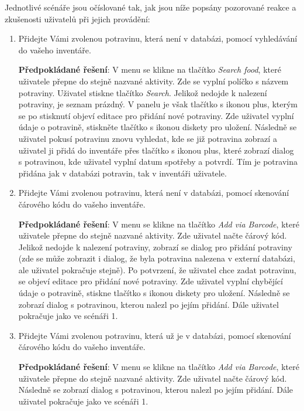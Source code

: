 \documentclass[thesis=B,czech]{FITthesis}[2013/10/20]
\begin{document}
Jednotlivé scénáře jsou očíslované tak, jak jsou níže popsány pozorované reakce a zkušenosti uživatelů při jejich provádění:
\begin{enumerate}
  \item Přidejte Vámi zvolenou potravinu, která není v databázi, pomocí vyhledávání do vašeho inventáře.
    
    \textbf{Předpokládané řešení}: V menu se klikne na tlačítko \textit{Search food}, které uživatele přepne do stejně nazvané aktivity. Zde se vyplní políčko s názvem potraviny. Uživatel stiskne tlačítko \textit{Search}. Jelikož nedojde k nalezení potraviny, je seznam prázdný. V panelu je však tlačítko s ikonou plus, kterým se po stisknutí objeví editace pro přidání nové potraviny. Zde uživatel vyplní údaje o potravině, stiskněte tlačítko s ikonou diskety pro uložení. Následně se uživatel pokusí potravinu znovu vyhledat, kde se již potravina zobrazí a uživatel ji přidá do inventáře přes tlačítko s ikonou plus, které zobrazí dialog s potravinou, kde uživatel vyplní datum spotřeby a potvrdí. Tím je potravina přidána jak v databázi potravin, tak v inventáři uživatele.

  \item Přidejte Vámi zvolenou potravinu, která není v databázi, pomocí skenování čárového kódu do vašeho inventáře.
    
    \textbf{Předpokládané řešení}: V menu se klikne na tlačítko \textit{Add via Barcode}, které uživatele přepne do stejně nazvané aktivity. Zde uživatel načte čárový kód. Jelikož nedojde k nalezení potraviny, zobrazí se dialog pro přidání potraviny (zde se může zobrazit i dialog, že byla potravina nalezena v externí databázi, ale uživatel pokračuje stejně). Po potvrzení, že uživatel chce zadat potravinu, se objeví editace pro přidání nové potraviny. Zde uživatel vyplní chybějící údaje o potravině, stiskne tlačítko s ikonou diskety pro uložení. Následně se zobrazí dialog s potravinou, kterou nalezl po jejím přidání. Dále uživatel pokračuje jako ve scénáři 1.
    
  \item Přidejte Vámi zvolenou potravinu, která už je v databázi, pomocí skenování čárového kódu do vašeho inventáře.
    
    \textbf{Předpokládané řešení}: V menu se klikne na tlačítko \textit{Add via Barcode}, které uživatele přepne do stejně nazvané aktivity. Zde uživatel načte čárový kód. Následně se zobrazí dialog s potravinou, kterou nalezl po jejím přidání. Dále uživatel pokračuje jako ve scénáři 1.
  

\end{enumerate}
\end{document}
